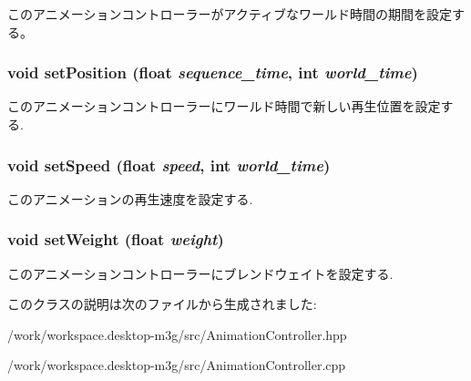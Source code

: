 このアニメーションコントローラーがアクティブなワールド時間の期間を設定する。 \hypertarget{classm3g_1_1AnimationController_da0d7a404b2a75ee182ca6351cf673d5}{
\subsubsection[{setPosition}]{\setlength{\rightskip}{0pt plus 5cm}void setPosition (float {\em sequence\_\-time}, \/  int {\em world\_\-time})}}
\label{classm3g_1_1AnimationController_da0d7a404b2a75ee182ca6351cf673d5}


このアニメーションコントローラーにワールド時間で新しい再生位置を設定する. \hypertarget{classm3g_1_1AnimationController_b32791d1a51df9ac8028792a841d06a6}{
\subsubsection[{setSpeed}]{\setlength{\rightskip}{0pt plus 5cm}void setSpeed (float {\em speed}, \/  int {\em world\_\-time})}}
\label{classm3g_1_1AnimationController_b32791d1a51df9ac8028792a841d06a6}


このアニメーションの再生速度を設定する. \hypertarget{classm3g_1_1AnimationController_8859df4d5a61714012bf9e1240189aed}{
\subsubsection[{setWeight}]{\setlength{\rightskip}{0pt plus 5cm}void setWeight (float {\em weight})}}
\label{classm3g_1_1AnimationController_8859df4d5a61714012bf9e1240189aed}


このアニメーションコントローラーにブレンドウェイトを設定する. 

このクラスの説明は次のファイルから生成されました:\begin{CompactItemize}
\item 
/work/workspace.desktop-m3g/src/AnimationController.hpp\item 
/work/workspace.desktop-m3g/src/AnimationController.cpp\end{CompactItemize}
